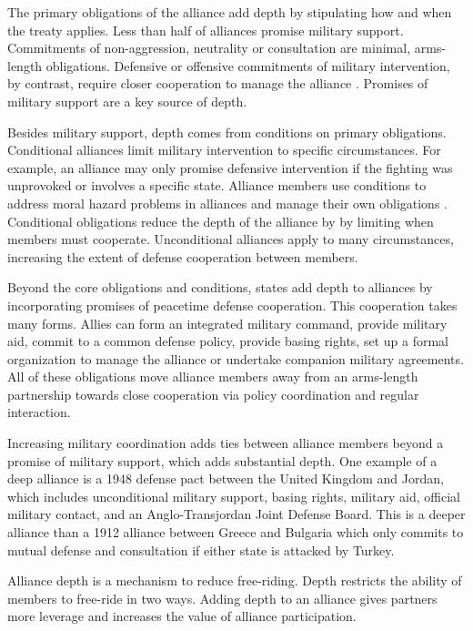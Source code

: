 \documentclass[12pt]{article}
\begin{document}
The primary obligations of the alliance add depth by stipulating how and when the treaty applies. 
Less than half of alliances promise military support. 
Commitments of non-aggression, neutrality or consultation are minimal, arms-length obligations. 
Defensive or offensive commitments of military intervention, by contrast, require closer cooperation to manage the alliance \citep{Snyder1997}. 
Promises of military support are a key source of depth. 


Besides military support, depth comes from conditions on primary obligations. 
Conditional alliances limit military intervention to specific circumstances. 
For example, an alliance may only promise defensive intervention if the fighting was unprovoked or involves a specific state.  
Alliance members use conditions to address moral hazard problems in alliances \citep{Benson2012, Bensonetal2014} and manage their own obligations \citep{Chibaetal2015}. 
Conditional obligations reduce the depth of the alliance by by limiting when members must cooperate. 
Unconditional alliances apply to many circumstances, increasing the extent of defense cooperation between members.


Beyond the core obligations and conditions, states add depth to alliances by incorporating promises of peacetime defense cooperation. 
This cooperation takes many forms. 
Allies can form an integrated military command, provide military aid, commit to a common defense policy, provide basing rights, set up a formal organization to manage the alliance or undertake companion military agreements. 
All of these obligations move alliance members away from an arms-length partnership towards close cooperation via policy coordination and regular interaction. 


Increasing military coordination adds ties between alliance members beyond a promise of military support, which adds substantial depth. 
One example of a deep alliance is a 1948 defense pact between the United Kingdom and Jordan, which includes unconditional military support, basing rights, military aid, official military contact, and an Anglo-Transjordan Joint Defense Board.  
This is a deeper alliance than a 1912 alliance between Greece and Bulgaria which only commits to mutual defense and consultation if either state is attacked by Turkey. 


Alliance depth is a mechanism to reduce free-riding. 
Depth restricts the ability of members to free-ride in two ways. 
Adding depth to an alliance gives partners more leverage and increases the value of alliance participation. 
\end{document}
